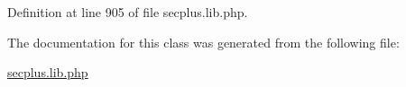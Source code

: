 Definition at line 905 of file secplus.lib.php.



The documentation for this class was generated from the following file:\begin{DoxyCompactItemize}
\item 
\hyperlink{secplus_8lib_8php}{secplus.lib.php}\end{DoxyCompactItemize}

